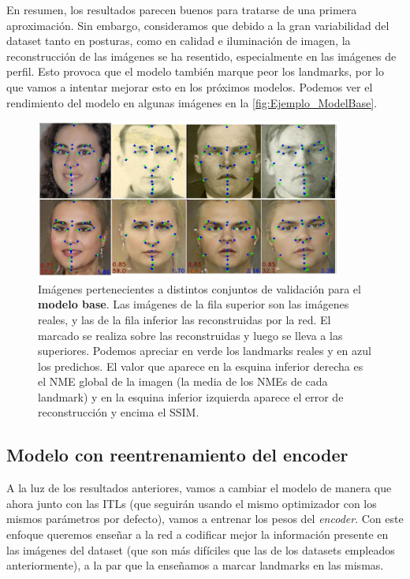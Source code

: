         \noindent En resumen, los resultados parecen buenos para tratarse de una primera aproximación. Sin embargo, consideramos que debido a la gran variabilidad del dataset tanto en posturas, como en calidad e iluminación de imagen, la reconstrucción de las imágenes se ha resentido, especialmente en las imágenes de perfil. Esto provoca que el modelo también marque peor los landmarks, por lo que vamos a intentar mejorar esto en los próximos modelos. Podemos ver el rendimiento del modelo en algunas imágenes en la \autoref{fig:Ejemplo_ModelBase}.

        \begin{figure}[!h]
            \centering
            \includegraphics[width=0.9\textwidth]{img/image_basemodel.png}
            \caption{Imágenes pertenecientes a distintos conjuntos de validación para el \textbf{modelo base}. Las imágenes de la fila superior son las imágenes reales, y las de la fila inferior las reconstruidas por la red. El marcado se realiza sobre las reconstruidas y luego se lleva a las superiores. Podemos apreciar en verde los landmarks reales y  en azul los predichos. El valor que aparece en la esquina inferior derecha es el NME global de la imagen (la media de los NMEs de cada landmark) y en la esquina inferior izquierda aparece el error de reconstrucción y encima el SSIM.}
            \label{fig:Ejemplo_ModelBase}
        \end{figure}

    \subsection{Modelo con reentrenamiento del encoder}
        \noindent A la luz de los resultados anteriores, vamos a cambiar el modelo de manera que ahora junto con las ITLs (que seguirán usando el mismo optimizador con los mismos parámetros por defecto), vamos a entrenar los pesos del \textit{encoder}. Con este enfoque queremos enseñar a la red a codificar mejor la información presente en las imágenes del dataset (que son más difíciles que las de los datasets empleados anteriormente), a la par que la enseñamos a marcar landmarks en las mismas. 

